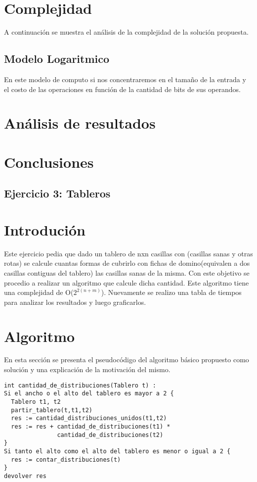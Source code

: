 \documentclass[a4paper, 12pt] {article}
\begin{document}
\section*{Complejidad}
A continuaci\'on se muestra el an\'alisis de la complejidad de la soluci\'on propuesta.
\subsection*{Modelo Logaritmico}
En este modelo de computo si nos concentraremos en el tama\~{n}o de la entrada y el costo de las operaciones en funci\'on de la cantidad de bits de sus operandos.

\section*{An\'alisis de resultados}

\section*{Conclusiones}
\newpage

\begin{center}
 \section*{Ejercicio 3: Tableros}
\end{center}

\bigskip
\section*{Introduci\'on}
Este ejercicio pedia que dado un tablero de nxn casillas con (casillas sanas y otras rotas) se calcule cuantas formas de cubrirlo con fichas de domino(equivalen a dos casillas contiguas del tablero) las casillas sanas de la misma.
Con este objetivo se procedio a realizar un algoritmo que calcule dicha cantidad. Este algoritmo tiene una complejidad de O($2^{2\left(n+m \right) }$). Nuevamente se realizo una tabla de tiempos para analizar los resultados y luego graficarlos. 
\section*{Algoritmo}
En esta secci\'on se presenta el pseudoc\'odigo del algoritmo b\'asico propuesto como soluci\'on y una explicaci\'on de la motivaci\'on del mismo.
\begin{verbatim}
int cantidad_de_distribuciones(Tablero t) :
Si el ancho o el alto del tablero es mayor a 2 {
  Tablero t1, t2
  partir_tablero(t,t1,t2)
  res := cantidad_distribuciones_unidos(t1,t2) 
  res := res + cantidad_de_distribuciones(t1) * 
               cantidad_de_distribuciones(t2)
}
Si tanto el alto como el alto del tablero es menor o igual a 2 {
  res := contar_distribuciones(t)
}
devolver res
\end{verbatim}
\end{document}

